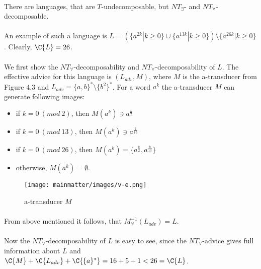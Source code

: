 \paragraph{}
\cveta There are languages, that are $T$-undecomposable, but $NT_{\exists}$- and $NT_{\forall}$-decomposable.

\paragraph{}
\dokaz An example of such a language is $L = (\{a^{2k}|k\geq 0\} \cup \{a^{13k}|k\geq 0\}) \setminus \{a^{26k}|k\geq 0\}$. Clearly, $\C{L} = 26$.

\paragraph{}
We first show the $NT_{\forall}$-decomposability and $NT_{\forall}$-decomposability of $L$. The effective advice for this language is $(L_{adv},M)$, where $M$ is the a-transducer from Figure 4.3 and $L_{adv} = \{a,b\}^* \setminus \{b^2\}^*$. For a word $a^k$ the a-transducer $M$ can generate following images:

\begin{itemize}
\item if $k = 0\ (mod\ 2)$, then $M(a^k) \ni a^{\frac{k}{2}}$
\item if $k = 0\ (mod\ 13)$, then $M(a^k) \ni a^{\frac{k}{13}}$
\item if $k = 0\ (mod\ 26)$, then $M(a^k) = \{a^{\frac{k}{2}}, a^{\frac{k}{13}}\}$
\item otherwise, $M(a^k) = \emptyset$.
\end{itemize}

\begin{figure}[h!]
\centering
\texttt{[image: mainmatter/images/v-e.png]}
\caption{a-transducer $M$}
\end{figure}

\paragraph{}
From above mentioned it follows, that $M^{-1}_{\forall}(L_{adv}) = L$.

\paragraph{}
Now the $NT_{\forall}$-decomposability of $L$ is easy to see, since the $NT_{\forall}$-advice gives full information about $L$ and $\C{M} + \C{L_{adv}} + \C{\{a\}^*} = 16 + 5 + 1 < 26 = \C{L}$.

